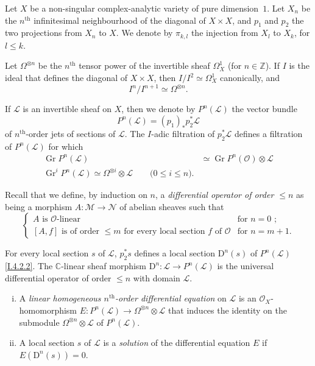 \documentclass{report}
\theoremstyle{plain}
\theoremstyle{definition}
\newenvironment{definition}[1]
    {\renewcommand\theinnercustomdefinition{#1}\innercustomdefinition}
    {\endinnercustomdefinition}
\newenvironment{env}[1]
    {\renewcommand\theinnercustomenv{#1}\innercustomenv}
    {\endinnercustomenv}
\newcommand{\sh}[1]{{\mathscr{#1}}}
\newcommand{\CC}{\mathbb{C}}
\newcommand{\ZZ}{\mathbb{Z}}
\newcommand{\DD}{\mathrm{D}}
\renewcommand{\leq}{\leqslant}
\DeclareMathOperator{\Gr}{Gr}
\newcommand{\oldpage}[1]{\marginpar{\footnotesize$\Big\vert$ \textit{p.~#1}}}
\begin{document}
\begin{env}{4.2}
\label{I.4.2}
  Let $X$ be a non-singular complex-analytic variety of pure dimension~$1$.
  Let $X_n$ be the $n^\mathrm{th}$ infinitesimal neighbourhood of the diagonal of $X\times X$, and $p_1$ and $p_2$ the two projections from $X_n$ to $X$.
  We denote by $\pi_{k,l}$ the injection from $X_l$ to
\oldpage{24}
  $X_k$, for $l\leq k$.

  Let $\Omega^{\otimes n}$ be the $n^\mathrm{th}$ tensor power of the invertible sheaf $\Omega_X^1$ (for $n\in\ZZ$).
  If $I$ is the ideal that defines the diagonal of $X\times X$, then $I/I^2\simeq\Omega_X^1$ canonically, and
  \[
  \label{I.4.2.1}
    I^n/I^{n+1} \simeq \Omega^{\otimes n}.
  \tag{4.2.1}
  \]

  If $\sh{L}$ is an invertible sheaf on $X$, then we denote by $P^n(\sh{L})$ the vector bundle
  \[
  \label{I.4.2.2}
    P^n(\sh{L}) = (p_1)_*p_2^*\sh{L}
  \tag{4.2.2}
  \]
  of $n^\mathrm{th}$-order jets of sections of $\sh{L}$.
  The $I$-adic filtration of $p_2^*\sh{L}$ defines a filtration of $P^n(\sh{L})$ for which
  \[
  \label{I.4.2.3}
    \begin{aligned}
      \Gr P^n(\sh{L}) &\simeq \Gr P^n(\sh{O})\otimes\sh{L}
    \\\Gr^i P^n(\sh{L}) \simeq \Omega^{\otimes i}\otimes\sh{L} \qquad\mbox{($0\leq i\leq n$).}
    \end{aligned}
  \tag{4.2.3}
  \]

  Recall that we define, by induction on $n$, a \emph{differential operator of order $\leq n$} as being a morphism $A\colon\sh{M}\to\sh{N}$ of abelian sheaves such that
  \[
    \begin{cases}
      \mbox{$A$ is $\sh{O}$-linear} & \mbox{for $n=0$ ;}
    \\\mbox{$[A,f]$ is of order $\leq m$ for every local section $f$ of $\sh{O}$} & \mbox{for $n=m+1$.}
    \end{cases}
  \]

  For every local section $s$ of $\sh{L}$, $p_2^*s$ defines a local section $\DD^n(s)$ of $P^n(\sh{L})$ \cref{I.4.2.2}.
  The $\CC$-linear sheaf morphism $\DD^n\colon\sh{L}\to P^n(\sh{L})$ is the universal differential operator of order $\leq n$ with domain $\sh{L}$.
\end{env}

\begin{definition}{4.3}
\label{I.4.3}
  \begin{enumerate}[(i)]
    \item A \emph{linear homogeneous $n^\mathrm{th}$-order differential equation} on $\sh{L}$ is an $\sh{O}_X$-homomorphism $E\colon P^n(\sh{L})\to\Omega^{\otimes n}\otimes\sh{L}$ that induces the identity on the submodule $\Omega^{\otimes n}\otimes\sh{L}$ of $P^n(\sh{L})$.
    \item A local section $s$ of $\sh{L}$ is a \emph{solution} of the differential equation $E$ if $E(\DD^n(s))=0$.
  \end{enumerate}
\end{definition}
\end{document}
